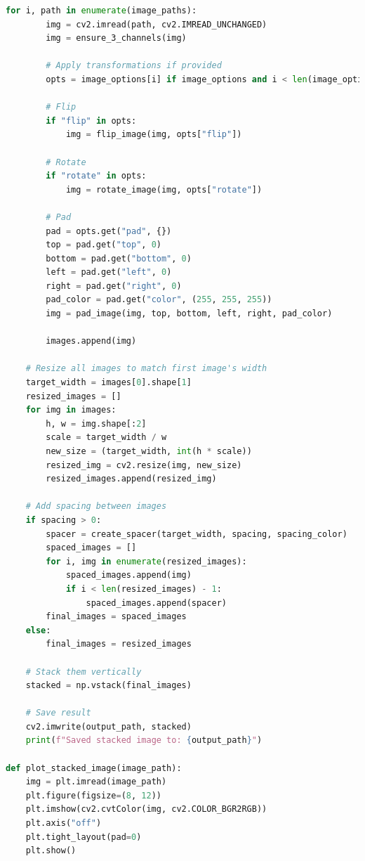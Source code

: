 \documentclass[12pt]{article}
\begin{document}
\begin{lstlisting}[language=Python, caption=Post-processing functions script., label=lst:pproc]
    for i, path in enumerate(image_paths):
        img = cv2.imread(path, cv2.IMREAD_UNCHANGED)
        img = ensure_3_channels(img)

        # Apply transformations if provided
        opts = image_options[i] if image_options and i < len(image_options) else {}

        # Flip
        if "flip" in opts:
            img = flip_image(img, opts["flip"])

        # Rotate
        if "rotate" in opts:
            img = rotate_image(img, opts["rotate"])

        # Pad
        pad = opts.get("pad", {})
        top = pad.get("top", 0)
        bottom = pad.get("bottom", 0)
        left = pad.get("left", 0)
        right = pad.get("right", 0)
        pad_color = pad.get("color", (255, 255, 255))
        img = pad_image(img, top, bottom, left, right, pad_color)

        images.append(img)

    # Resize all images to match first image's width
    target_width = images[0].shape[1]
    resized_images = []
    for img in images:
        h, w = img.shape[:2]
        scale = target_width / w
        new_size = (target_width, int(h * scale))
        resized_img = cv2.resize(img, new_size)
        resized_images.append(resized_img)

    # Add spacing between images
    if spacing > 0:
        spacer = create_spacer(target_width, spacing, spacing_color)
        spaced_images = []
        for i, img in enumerate(resized_images):
            spaced_images.append(img)
            if i < len(resized_images) - 1:
                spaced_images.append(spacer)
        final_images = spaced_images
    else:
        final_images = resized_images

    # Stack them vertically
    stacked = np.vstack(final_images)

    # Save result
    cv2.imwrite(output_path, stacked)
    print(f"Saved stacked image to: {output_path}")

def plot_stacked_image(image_path):
    img = plt.imread(image_path)
    plt.figure(figsize=(8, 12))
    plt.imshow(cv2.cvtColor(img, cv2.COLOR_BGR2RGB))
    plt.axis("off")
    plt.tight_layout(pad=0)
    plt.show()
\end{lstlisting}
\end{document}
